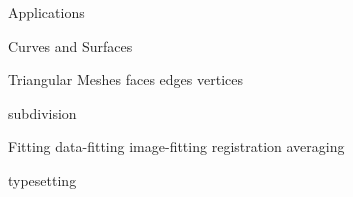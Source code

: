 \begin{plSection}{Applications}
\begin{plSection}{Curves and Surfaces}
\begin{plSection}{Triangular Meshes}
{faces}
{edges}
{vertices}
\end{plSection}%
{subdivision}
\begin{plSection}{Fitting}
{data-fitting}
{image-fitting}
{registration}
{averaging}
\end{plSection} %
\end{plSection}%
\end{plSection}%
\BeginAppendices
{typesetting}
